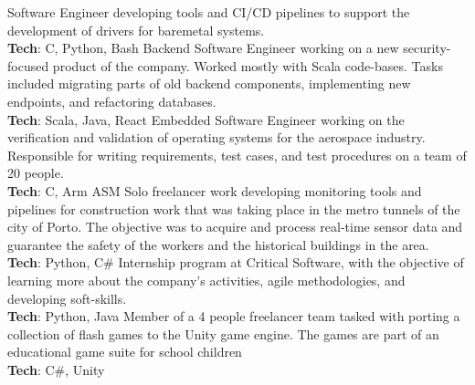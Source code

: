 \documentclass[letterpaper]{twentysecondcv} %
\begin{document}
\begin{twenty}
    {Software Engineer developing tools and CI/CD pipelines to support
    the development of drivers for baremetal systems.\\
    \textbf{Tech}: C, Python, Bash}
    {Backend Software Engineer working on a new security-focused product of
    the company. Worked mostly with Scala code-bases. Tasks included
    migrating parts of old backend components, implementing new endpoints, and
    refactoring databases.\\
    \textbf{Tech}: Scala, Java, React}
    {Embedded Software Engineer working on the verification and validation of
    operating systems for the aerospace industry. Responsible for writing
    requirements, test cases, and test procedures on a team of 20 people.\\
    \textbf{Tech}: C, Arm ASM}
    {Solo freelancer work developing monitoring tools and pipelines for
    construction work that was taking place in the metro tunnels of the city of
    Porto. The objective was to acquire and process real-time sensor data and
    guarantee the safety of the workers and the historical buildings in the area.\\
    \textbf{Tech}: Python, C\#}
    {Internship program at Critical Software, with the objective of learning
    more about the company's activities, agile methodologies, and developing
    soft-skills.\\
    \textbf{Tech}: Python, Java}
    {Member of a 4 people freelancer team tasked with porting a collection
    of flash games to the Unity game engine. The games are part of an educational
    game suite for school children\\
    \textbf{Tech}: C\#, Unity}
\end{twenty}

\vfill

\end{document}
